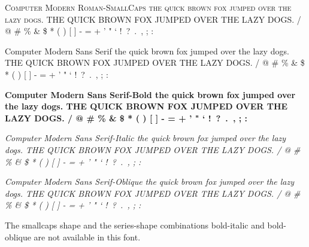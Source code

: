 \documentclass{article}
\begin{document}
{\scshape
Computer Modern Roman-SmallCaps \newline
the quick brown fox jumped over the lazy dogs. \newline
THE QUICK BROWN FOX JUMPED OVER THE LAZY DOGS.  / @ \# \% \& \$ * ( ) [ ] - = + ' " ` !\ ?\ .\ , ; : }\par
\newpage
{\selectfont
Computer Modern Sans Serif \newline
the quick brown fox jumped over the lazy dogs. \newline
THE QUICK BROWN FOX JUMPED OVER THE LAZY DOGS.  / @ \# \% \& \$ * ( ) [ ] - = + ' " ` !\ ?\ .\ , ; : \par
{\bfseries
Computer Modern Sans Serif-Bold \newline
the quick brown fox jumped over the lazy dogs. \newline
THE QUICK BROWN FOX JUMPED OVER THE LAZY DOGS.  / @ \# \% \& \$ * ( ) [ ] - = + ' " ` !\ ?\ .\ , ; : }\par
{\itshape
Computer Modern Sans Serif-Italic \newline
the quick brown fox jumped over the lazy dogs. \newline
THE QUICK BROWN FOX JUMPED OVER THE LAZY DOGS.  / @ \# \% \& \$ * ( ) [ ] - = + ' " ` !\ ?\ .\ , ; : }\par
{\slshape
Computer Modern Sans Serif-Oblique \newline
the quick brown fox jumped over the lazy dogs. \newline
THE QUICK BROWN FOX JUMPED OVER THE LAZY DOGS.  / @ \# \% \& \$ * ( ) [ ] - = + ' " ` !\ ?\ .\ , ; : }}\par
\noindent
The smallcaps shape and the series-shape combinations bold-italic and
bold-oblique are not available in this font. \par
\end{document}
